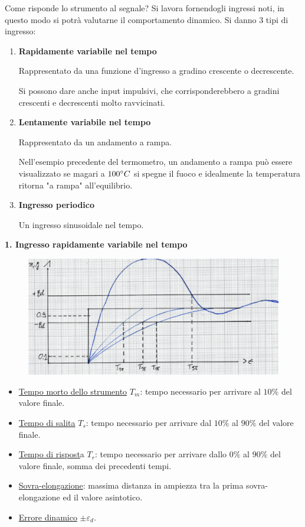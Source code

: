 \documentclass[a4paper, 15pt]{article}
\begin{document}
\begin{adjustwidth}{2in}{}
	Come risponde lo strumento al segnale? Si lavora fornendogli ingressi noti, in questo modo si potrà valutarne il comportamento dinamico. \newline 
\newpage	
	Si danno 3 tipi di ingresso: 
	\begin{enumerate}
		\item \textbf{Rapidamente variabile nel tempo} 
		 
		Rappresentato da una funzione d'ingresso a gradino crescente o decrescente. 
		
		Si possono dare anche input impulsivi, che corrisponderebbero a gradini crescenti e decrescenti molto ravvicinati. 
		
		\item \textbf{Lentamente variabile nel tempo} 
		 
		Rappresentato da un andamento a rampa.
		
		
		Nell'esempio precedente del termometro, un andamento a rampa può essere visualizzato se magari a $100 \degree C$ si spegne il fuoco e idealmente la temperatura ritorna "a rampa" all'equilibrio. 
		
		\item \textbf{Ingresso periodico} 
		 
		Un ingresso sinusoidale nel tempo. 
	\end{enumerate}

	\textbf{1. Ingresso rapidamente variabile nel tempo}  
\begin{figure}[H]
	\centering
	\includegraphics[width=0.5\linewidth]{fig/screenshot048}
	\label{fig:screenshot048}
\end{figure}
	\begin{itemize}
	\item \underline{Tempo morto dello strumento} $T_m$: tempo necessario per arrivare al $10\%$ del valore finale. 
	\item \underline{Tempo di salita} $T_s$: tempo necessario per arrivare dal $10\%$ al $90\%$ del valore finale.
	\item \underline{Tempo di rispost}a $T_r$: tempo necessario per arrivare dallo $0\%$ al $90\%$ del valore finale, somma dei precedenti tempi. 
	\item \underline{Sovra-elongazione}: massima distanza in ampiezza tra la prima sovra-elongazione ed il valore asintotico.
	\item \underline{Errore dinamico} $\pm \varepsilon_d$.
	

\end{itemize}
\end{adjustwidth}
\end{document}
